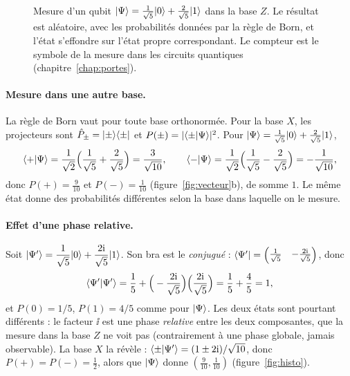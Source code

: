 \begin{figure}[!ht]
\centering
{}
\caption{Mesure d'un qubit $|\Psi\rangle=\frac{1}{\sqrt5}|0\rangle+\frac{2}{\sqrt5}|1\rangle$ dans la
base $Z$. Le résultat est aléatoire, avec les probabilités données par la règle de Born, et l'état
s'effondre sur l'état propre correspondant. Le compteur est le symbole de la mesure dans les
circuits quantiques (chapitre~\ref{chap:portes}).}
\label{fig:mesure}
\end{figure}

\paragraph{Mesure dans une autre base.} La règle de Born vaut pour toute base orthonormée. Pour la base
$X$, les projecteurs sont $\hat P_\pm=|\pm\rangle\langle \pm|$ et $P(\pm)=|\langle \pm|\Psi\rangle|^2$. Pour
$|\Psi\rangle=\frac{1}{\sqrt5}|0\rangle+\frac{2}{\sqrt5}|1\rangle$,
\[
  \langle +|\Psi\rangle=\frac{1}{\sqrt2}\Big(\frac{1}{\sqrt5}+\frac{2}{\sqrt5}\Big)=\frac{3}{\sqrt{10}},\qquad
  \langle -|\Psi\rangle=\frac{1}{\sqrt2}\Big(\frac{1}{\sqrt5}-\frac{2}{\sqrt5}\Big)=-\frac{1}{\sqrt{10}},
\]
donc $P(+)=\frac{9}{10}$ et $P(-)=\frac{1}{10}$ (figure~\ref{fig:vecteur}b), de somme $1$. Le même état
donne des probabilités différentes selon la base dans laquelle on le mesure.

\paragraph{Effet d'une phase relative.} Soit $|\Psi'\rangle=\dfrac{1}{\sqrt5}|0\rangle
+\dfrac{2\mathrm{i}}{\sqrt5}|1\rangle$. Son bra est le \emph{conjugué} :
$\langle \Psi'|=\begin{pmatrix}\frac{1}{\sqrt5} & -\frac{2\mathrm{i}}{\sqrt5}\end{pmatrix}$, donc
\[
  \langle \Psi'|\Psi'\rangle=\frac15+\Big(-\frac{2\mathrm{i}}{\sqrt5}\Big)\Big(\frac{2\mathrm{i}}{\sqrt5}\Big)
  =\frac15+\frac45=1 ,
\]
et $P(0)=1/5$, $P(1)=4/5$ comme pour $|\Psi\rangle$. Les deux états sont pourtant
différents : le facteur $\ii$ est une phase \emph{relative} entre les deux composantes,
que la mesure dans la base $Z$ ne voit pas (contrairement à une phase globale, jamais
observable). La base $X$ la révèle : $\langle \pm|\Psi'\rangle=(1\pm2\mathrm{i})/\sqrt{10}$, donc
$P(+)=P(-)=\frac12$, alors que $|\Psi\rangle$ donne $(\frac{9}{10},\frac{1}{10})$
(figure~\ref{fig:histo}).

